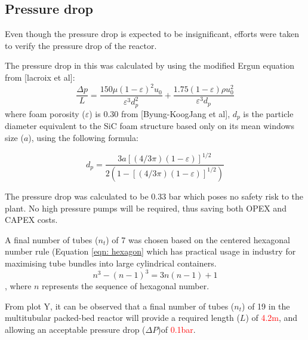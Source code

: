 \subsection{Pressure drop}
Even though the pressure drop is expected to be insignificant, efforts were taken to verify the pressure drop of the reactor.

The pressure drop in this was calculated by using the modified Ergun equation from [lacroix et al]: 
\begin{equation}
    \frac{\Delta p}{L} = \frac{150 \mu (1- \varepsilon)^2 u_0}{\varepsilon^3 d_p^2} + \frac{1.75(1-\varepsilon)\rho u_0^2}{\varepsilon^3 d_p}
    \label{eqn:ergun}
\end{equation}
where foam porosity ($\varepsilon$) is 0.30 from [Byung-KoogJang et al], $d_p$ is the particle diameter equivalent to the SiC foam structure based only on its mean windows size ($a$), using the following formula:

\begin{equation}
d_{p}=\frac{3a[(4 / 3 \pi)(1-\varepsilon)]^{1 / 2}}{2(1-[(4 / 3 \pi)(1-\varepsilon)]^{1 / 2})}
\end{equation}

The pressure drop was calculated to be 0.33 bar which poses no safety risk to the plant. No high pressure pumps will be required, thus saving both OPEX and CAPEX costs.


A final number of tubes ($n_t$) of 7 was chosen based on the centered hexagonal number rule (Equation \ref{eqn: hexagon} which has practical usage in industry for maximising tube bundles into large cylindrical containers. 
\begin{equation}
    n^3 - (n-1)^3 = 3n(n-1)+1
    \label{eqn: hexagon}
\end{equation},
where $n$ represents the sequence of hexagonal number. 

From plot Y, it can be observed that a final number of tubes ($n_t$) of 19 in the multitubular packed-bed reactor will provide a required length ($L$) of \textcolor{red}{4.2m}, and allowing an acceptable pressure drop ($\Delta P$)of \textcolor{red}{0.1bar}.

